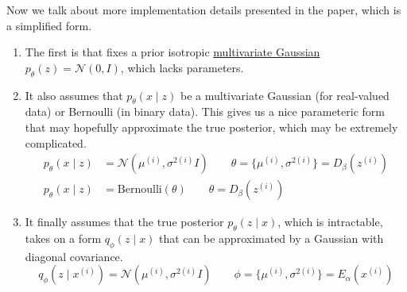   Now we talk about more implementation details presented in the paper, which is a simplified form. 
  \begin{enumerate}
    \item The first is that \cite{vae} fixes a prior isotropic \hyperref[prob-def:multivariate-gaussian]{multivariate Gaussian} $p_\theta (z) = \mathcal{N}(0, I)$, which lacks parameters. 

    \item It also assumes that $p_\theta (x \mid z)$ be a multivariate Gaussian (for real-valued data) or Bernoulli (in binary data). This gives us a nice parameteric form that may hopefully approximate the true posterior, which may be extremely complicated. 
    \begin{align}
      p_\theta (x \mid z) & = \mathcal{N}(\mu^{(i)}, \sigma^{2(i)} I) \qquad \theta = \{\mu^{(i)}, \sigma^{2 (i)} \} = D_\beta (z^{(i)}) \\
      p_\theta (x \mid z) & = \mathrm{Bernoulli}(\theta) \qquad \theta = D_\beta (z^{(i)}) 
    \end{align}

    \item It finally assumes that the true posterior $p_\theta (z \mid x)$, which is intractable, takes on a form $q_\phi (z \mid x)$ that can be approximated by a Gaussian with diagonal covariance. 
    \begin{equation}
      q_\phi (z \mid x^{(i)}) = \mathcal{N}(\mu^{(i)}, \sigma^{2 (i)} I) \qquad \phi = \{\mu^{(i)}, \sigma^{2 (i)} \} = E_\alpha (x^{(i)})
    \end{equation}
  \end{enumerate} 

